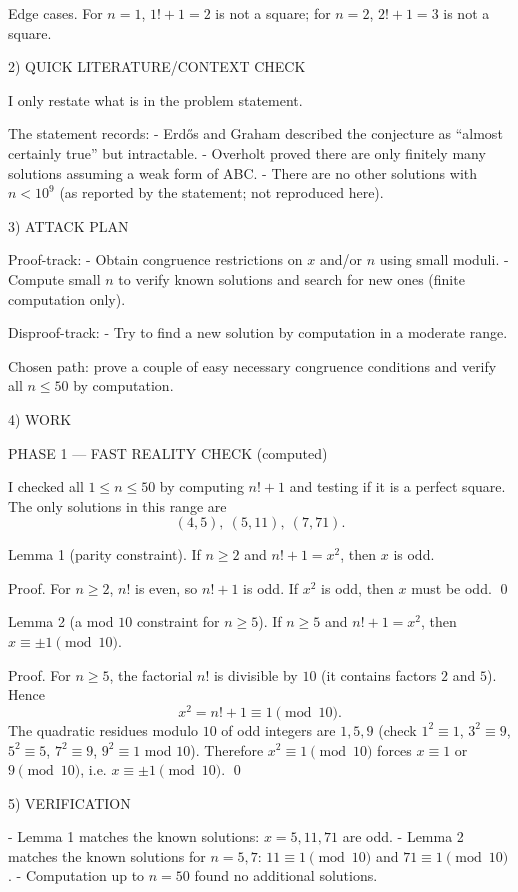 Edge cases.
For $n=1$, $1!+1=2$ is not a square; for $n=2$, $2!+1=3$ is not a square.

2) QUICK LITERATURE/CONTEXT CHECK

I only restate what is in the problem statement.

The statement records:
- Erd\H{o}s and Graham described the conjecture as “almost certainly true” but intractable.
- Overholt proved there are only finitely many solutions assuming a weak form of ABC.
- There are no other solutions with $n<10^9$ (as reported by the statement; not reproduced here).

3) ATTACK PLAN

Proof-track:
- Obtain congruence restrictions on $x$ and/or $n$ using small moduli.
- Compute small $n$ to verify known solutions and search for new ones (finite computation only).

Disproof-track:
- Try to find a new solution by computation in a moderate range.

Chosen path: prove a couple of easy necessary congruence conditions and verify all $n\le 50$ by computation.

4) WORK

PHASE 1 — FAST REALITY CHECK (computed)

I checked all $1\le n\le 50$ by computing $n!+1$ and testing if it is a perfect square. The only solutions in this range are
\[
(4,5),\ (5,11),\ (7,71).
\]

Lemma 1 (parity constraint).
If $n\ge 2$ and $n!+1=x^2$, then $x$ is odd.

Proof.
For $n\ge 2$, $n!$ is even, so $n!+1$ is odd. If $x^2$ is odd, then $x$ must be odd. \qed

Lemma 2 (a mod $10$ constraint for $n\ge 5$).
If $n\ge 5$ and $n!+1=x^2$, then $x\equiv \pm 1\pmod{10}$.

Proof.
For $n\ge 5$, the factorial $n!$ is divisible by $10$ (it contains factors $2$ and $5$). Hence
\[
 x^2 = n!+1 \equiv 1 \pmod{10}.
\]
The quadratic residues modulo $10$ of odd integers are $1,5,9$ (check $1^2\equiv 1$, $3^2\equiv 9$, $5^2\equiv 5$, $7^2\equiv 9$, $9^2\equiv 1$ mod $10$). Therefore $x^2\equiv 1\pmod{10}$ forces $x\equiv 1$ or $9\pmod{10}$, i.e. $x\equiv \pm 1\pmod{10}$. \qed

5) VERIFICATION

- Lemma 1 matches the known solutions: $x=5,11,71$ are odd.
- Lemma 2 matches the known solutions for $n=5,7$: $11\equiv 1\pmod{10}$ and $71\equiv 1\pmod{10}$.
- Computation up to $n=50$ found no additional solutions.

